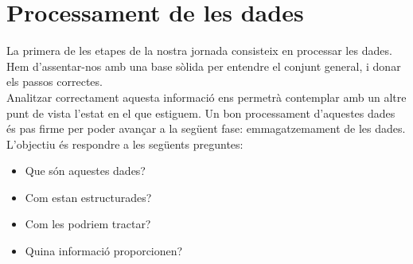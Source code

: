 \chapter{Processament de les dades}\label{ch:log-processing}

La primera de les etapes de la nostra jornada consisteix en processar les dades.
Hem d'assentar-nos amb una base sòlida per entendre el conjunt general, i donar els passos correctes. \\

\noindent
Analitzar correctament aquesta informació ens permetrà contemplar amb un altre punt de vista l'estat en el que estiguem.
Un bon processament d'aquestes dades és pas firme per poder avançar a la següent fase: emmagatzemament de les dades. \\

\noindent
L'objectiu és respondre a les següents preguntes:

\begin{itemize}
    \item Que són aquestes dades?
    \item Com estan estructurades?
    \item Com les podriem tractar?
    \item Quina informació proporcionen?
\end{itemize}


\clearpage

